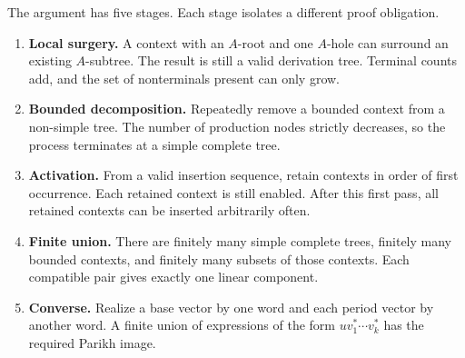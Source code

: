 \documentclass[11pt,a4paper]{article}
\numberwithin{equation}{section}
\theoremstyle{plain}
\theoremstyle{definition}
\theoremstyle{remark}
\begin{document}
The argument has five stages. Each stage isolates a different proof obligation.
\begin{enumerate}
\item \textbf{Local surgery.} A context with an $A$-root and one $A$-hole can surround an existing $A$-subtree. The result is still a valid derivation tree. Terminal counts add, and the set of nonterminals present can only grow.
\item \textbf{Bounded decomposition.} Repeatedly remove a bounded context from a non-simple tree. The number of production nodes strictly decreases, so the process terminates at a simple complete tree.
\item \textbf{Activation.} From a valid insertion sequence, retain contexts in order of first occurrence. Each retained context is still enabled. After this first pass, all retained contexts can be inserted arbitrarily often.
\item \textbf{Finite union.} There are finitely many simple complete trees, finitely many bounded contexts, and finitely many subsets of those contexts. Each compatible pair gives exactly one linear component.
\item \textbf{Converse.} Realize a base vector by one word and each period vector by another word. A finite union of expressions of the form $u v_1^*\cdots v_k^*$ has the required Parikh image.
\end{enumerate}

\begin{center}
\end{center}
\end{document}
